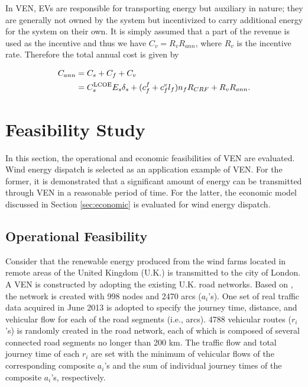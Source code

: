 \documentclass[journal]{IEEEtran}
\begin{document}
In VEN, EVs are responsible for transporting energy but auxiliary in nature; they are generally not owned by the system but incentivized to carry additional energy for the system on their own. It is simply assumed that a part of the revenue is used as the incentive and thus we have $C_v = R_v R_{ann}$, where $R_v$ is the incentive rate. Therefore the total annual cost is given by

\begin{align*}
\vspace{-0.9cm}
	C_{ann} &=  C_{s} + C_{f} + C_{v} \\
	&=  C^{\text{LCOE}}_{s}E_{s}\delta_s + (c^f_f+c^v_{f}l_{f})n_{f}R_{CRF} + R_v R_{ann}.
\end{align*}



\section{Feasibility Study} \label{sec:simulation}


In this section, the operational and economic feasibilities of VEN are evaluated. Wind energy dispatch is selected as an application example of VEN. For the former,  it is demonstrated that a significant amount of energy can be transmitted through VEN in a reasonable period of time. For the latter, the economic model discussed in Section \ref{sec:economic} is evaluated for wind energy dispatch.

\subsection{Operational Feasibility} \label{subsec:operational}
Consider that the renewable energy produced from the wind farms located in remote areas of the United Kingdom (U.K.) is transmitted to the city of London.  A VEN is constructed by adopting the existing U.K. road networks.  Based on \cite{ukroads}, the network is created with 998 nodes and 2470 arcs ($a_i$'s). One set of real traffic data acquired in June 2013 is adopted to specify the journey time, distance, and vehicular flow for each of the road segments (i.e., arcs). 4788 vehicular routes ($r_i$'s) is randomly created in the road network, each of  which is composed of several connected road segments  no longer than 200 km. The traffic flow and total journey time of each $r_i$ are set with the minimum of vehicular flows of the corresponding composite $a_i$'s and the sum of individual journey times of the composite $a_i$'s, respectively.
\end{document}
